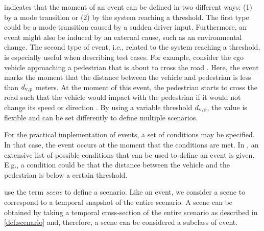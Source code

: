  indicates that the moment of an event can be defined in two different ways: \cstart(1) by a mode transition or (2) by the system reaching a threshold. 
The first type \cend\cstartd could be a mode transition \cendd\cstartf caused by \cendf\cstart a sudden driver input. Furthermore, an event might also be induced by an external cause, such as an environmental change. The second type of event, i.e., related to the system reaching a threshold, \cend is especially useful when describing test cases. For example, consider the ego vehicle approaching a pedestrian that is about to cross the road \autocite{seiniger2015test}. 
Here, the event marks the moment that the distance between the vehicle and pedestrian is less than $d_{\mathrm{v,p}}$ meters. 
At the moment of this event, the pedestrian starts to cross the road such that the vehicle would impact with the pedestrian if it would not change its speed or direction \autocite{seiniger2015test}.
By using a variable threshold $d_{\mathrm{v,p}}$, the value is flexible and can be set differently to define multiple scenarios.

For the practical implementation of events, a set of conditions may be specified. In that case, the event occurs at the moment that the conditions are met. In \autocite{openscenario}, an extensive list of possible conditions that can be used to define an event is given. E.g., a condition could be that the distance between the vehicle and the pedestrian is below a certain threshold.

\cstarte\begin{remark}
	\textcite{geyer2014,ulbrich2015} use the term \emph{scene} to define a scenario.
	Like an event, we consider a scene to correspond to a temporal snapshot of the entire scenario. A scene can be obtained by taking a temporal cross-section of the entire scenario as described in \cref{def:scenario} and, therefore, a scene can be considered a subclass of event.
\end{remark}\cende




